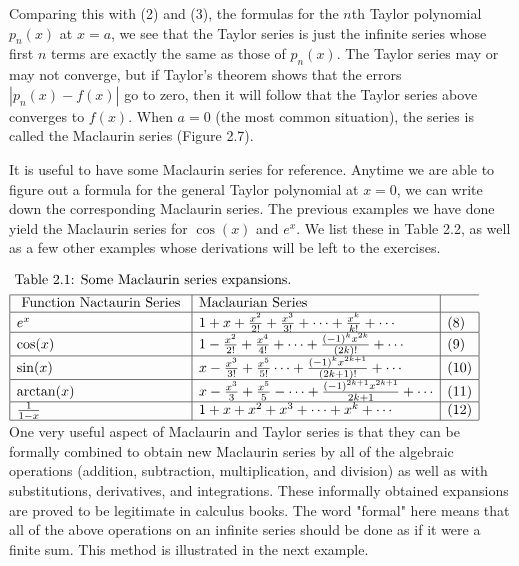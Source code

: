 \documentclass[../main.tex]{subfiles}
\begin{document}
Comparing this with (2) and (3), the formulas for the $n$th Taylor polynomial $p_{n}(x)$ at $x=a$, we see that the Taylor series is just the infinite series whose first $n$ terms are exactly the same as those of $p_{n}(x)$. The Taylor series may or may not converge, but if Taylor's theorem shows that the errors $\left|p_{n}(x)-f(x)\right|$ go to zero, then it will follow that the Taylor series above converges to $f(x)$. When $a=0$ (the most common situation), the series is called the Maclaurin series (Figure 2.7).

It is useful to have some Maclaurin series for reference. Anytime we are able to figure out a formula for the general Taylor polynomial at $x=0$, we can write down the corresponding Maclaurin series. The previous examples we have done yield the Maclaurin series for $\cos (x)$ and $e^{x}$. We list these in Table 2.2, as well as a few other examples whose derivations will be left to the exercises.

$
\begin{aligned}
\centering
&\text { Table 2.1: Some Maclaurin series expansions. }\\
&\begin{array}{|l|l|l|}
\hline \text { Function Nactaurin Series } & \text {Maclaurian Series } \\
\hline e^{x} & 1+x+\frac{x^{2}}{2 !}+\frac{x^{3}}{3 !}+\cdots+\frac{x^{k}}{k !}+\cdots \label{eq:8} & (8) \\
\hline \cos (x) & 1-\frac{x^{2}}{2 !}+\frac{x^{4}}{4 !}+\cdots+\frac{(-1)^{k} x^{2 k}}{(2 k) !}+\cdots \label{eq:9} & (9) \\
\hline \sin (x) & x-\frac{x^{3}}{3 !}+\frac{x^{5}}{5 !} \cdots+\frac{(-1)^{k} x^{2 k+1}}{(2 k+1) !}+\cdots  \label{eq:10} & (10) \\
\hline \arctan (x) & x-\frac{x^{3}}{3}+\frac{x^{5}}{5}-\cdots+\frac{(-1)^{2 k+1} x^{2 k+1}}{2 k+1}+\cdots  \label{eq:11} & (11) \\
\hline \frac{1}{1-x} & 1+x+x^{2}+x^{3}+\cdots+x^{k}+\cdots  \label{eq:12} &(12) \\
\hline
\end{array}
\end{aligned}
$\\

One very useful aspect of Maclaurin and Taylor series is that they can be formally combined to obtain new Maclaurin series by all of the algebraic operations (addition, subtraction, multiplication, and division) as well as with substitutions, derivatives, and integrations. These informally obtained expansions are proved to be legitimate in calculus books. The word "formal" here means that all of the above operations on an infinite series should be done as if it were a finite sum. This method is illustrated in the next example.
\end{document}
